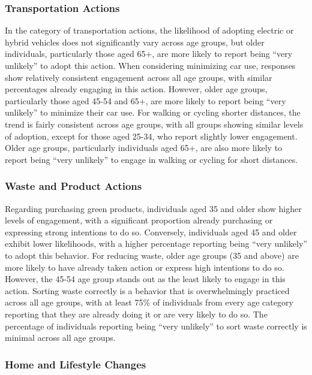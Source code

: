 \documentclass[
  letterpaper,
  DIV=11,
  numbers=noendperiod]{scrartcl}
\begin{document}
\subsubsection{Transportation Actions}\label{transportation-actions-2}

In the category of transportation actions, the likelihood of adopting
electric or hybrid vehicles does not significantly vary across age
groups, but older individuals, particularly those aged 65+, are more
likely to report being ``very unlikely'' to adopt this action. When
considering minimizing car use, responses show relatively consistent
engagement across all age groups, with similar percentages already
engaging in this action. However, older age groups, particularly those
aged 45-54 and 65+, are more likely to report being ``very unlikely'' to
minimize their car use. For walking or cycling shorter distances, the
trend is fairly consistent across age groups, with all groups showing
similar levels of adoption, except for those aged 25-34, who report
slightly lower engagement. Older age groups, particularly individuals
aged 65+, are also more likely to report being ``very unlikely'' to
engage in walking or cycling for short distances.

\subsubsection{Waste and Product
Actions}\label{waste-and-product-actions-2}

Regarding purchasing green products, individuals aged 35 and older show
higher levels of engagement, with a significant proportion already
purchasing or expressing strong intentions to do so. Conversely,
individuals aged 45 and older exhibit lower likelihoods, with a higher
percentage reporting being ``very unlikely'' to adopt this behavior. For
reducing waste, older age groups (35 and above) are more likely to have
already taken action or express high intentions to do so. However, the
45-54 age group stands out as the least likely to engage in this action.
Sorting waste correctly is a behavior that is overwhelmingly practiced
across all age groups, with at least 75\% of individuals from every age
category reporting that they are already doing it or are very likely to
do so. The percentage of individuals reporting being ``very unlikely''
to sort waste correctly is minimal across all age groups.

\subsubsection{Home and Lifestyle
Changes}\label{home-and-lifestyle-changes-2}
\end{document}
